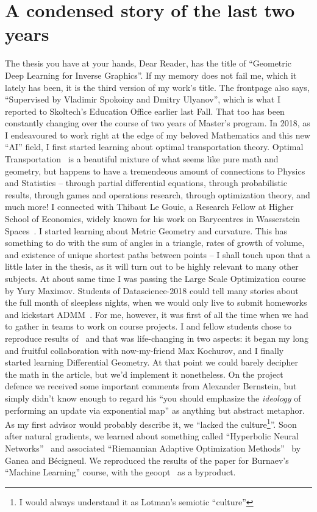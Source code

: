 \section*{A condensed story of the last two years}

The thesis you have at your hands, Dear Reader, has the title of ``Geometric
Deep Learning for Inverse Graphics''. If my memory does not fail me, which it
lately has been, it is the third version of my work's title. The frontpage also
says, ``Supervised by Vladimir Spokoiny and Dmitry Ulyanov'', which is what I
reported to Skoltech's Education Office earlier last Fall. That too has been
constantly changing over the course of two years of Master's program.  In 2018,
as I endeavoured to work right at the edge of my beloved Mathematics and this
new ``AI'' field, I first started learning about optimal transportation theory.
Optimal Transportation~\citep{villaniOldNew,ambrosioOTSummerSchool} is a
beautiful mixture of what seems like pure math and geometry, but happens to
have a tremendeous amount of connections to Physics and Statistics -- through
partial differential equations, through probabilistic results, through games
and operations research, through optimization theory, and much more! I
connected with Thibaut Le Gouic, a Research Fellow at Higher School of
Economics, widely known for his work on Barycentres in Wasserstein
Spaces~\citep{le2017existence}. I started learning about Metric Geometry and
curvature. This has something to do with the sum of angles in a triangle, rates
of growth of volume, and existence of unique shortest paths between points -- I
shall touch upon that a little later in the thesis, as it will turn out to be
highly relevant to many other subjects. At about same time I was passing the
Large Scale Optimization course by Yury Maximov. Students of Datascience-2018
could tell many stories about the full month of sleepless nights, when we would
only live to submit homeworks and kickstart ADMM~\citep{admmTweet,admmBoyd}.
For me, however, it was first of all the time when we had to gather in teams to work
on course projects. I and fellow students chose to reproduce results
of~\citet{acceleratingNatgrad} and that was life-changing in two aspects: it
began my long and fruitful collaboration with now-my-friend Max Kochurov, and I
finally started learning Differential Geometry. At that point we could barely
decipher the math in the article, but we'd implement it nonetheless. On the project
defence we received some important comments from Alexander Bernstein, but simply
didn't know enough to regard his ``you should emphasize the \emph{ideology}
of performing an update via exponential map'' as anything but abstract
metaphor.  As my first advisor would probably describe it, we ``lacked the
culture\footnote{I would always understand it as Lotman's semiotic
``culture''}''.  Soon after natural gradients, we learned about something called
``Hyperbolic Neural Networks''~\citep{ganeaHNNs} and associated ``Riemannian
Adaptive Optimization Methods''~\citep{riemAdaptive} by Ganea and B\'ecigneul.
We reproduced the results of the paper for Burnaev's ``Machine Learning'' course,
with the geoopt~\cite{geoopt} as a byproduct.

